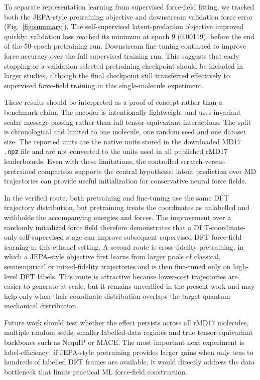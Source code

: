 \documentclass[11pt]{article}
\begin{document}
To separate representation learning from supervised force-field fitting, we tracked both the JEPA-style pretraining objective and downstream validation force error (Fig.~\ref{fig:summary}). The self-supervised latent-prediction objective improved quickly: validation loss reached its minimum at epoch 9 (0.00119), before the end of the 50-epoch pretraining run. Downstream fine-tuning continued to improve force accuracy over the full supervised training run. This suggests that early stopping or a validation-selected pretraining checkpoint should be included in larger studies, although the final checkpoint still transferred effectively to supervised force-field training in this single-molecule experiment.

These results should be interpreted as a proof of concept rather than a benchmark claim. The encoder is intentionally lightweight and uses invariant scalar message passing rather than full tensor-equivariant interactions. The split is chronological and limited to one molecule, one random seed and one dataset size. The reported units are the native units stored in the downloaded MD17 \texttt{.npz} file and are not converted to the units used in all published rMD17 leaderboards. Even with these limitations, the controlled scratch-versus-pretrained comparison supports the central hypothesis: latent prediction over MD trajectories can provide useful initialization for conservative neural force fields.

In the verified route, both pretraining and fine-tuning use the same DFT trajectory distribution, but pretraining treats the coordinates as unlabelled and withholds the accompanying energies and forces. The improvement over a randomly initialized force field therefore demonstrates that a DFT-coordinate-only self-supervised stage can improve subsequent supervised DFT force-field learning in this ethanol setting. A second route is cross-fidelity pretraining, in which a JEPA-style objective first learns from larger pools of classical, semiempirical or mixed-fidelity trajectories and is then fine-tuned only on high-level DFT labels. This route is attractive because lower-cost trajectories are easier to generate at scale, but it remains unverified in the present work and may help only when their coordinate distribution overlaps the target quantum-mechanical distribution.

Future work should test whether the effect persists across all rMD17 molecules, multiple random seeds, smaller labelled-data regimes and true tensor-equivariant backbones such as NequIP or MACE. The most important next experiment is label-efficiency: if JEPA-style pretraining provides larger gains when only tens to hundreds of labelled DFT frames are available, it would directly address the data bottleneck that limits practical ML force-field construction.
\end{document}
